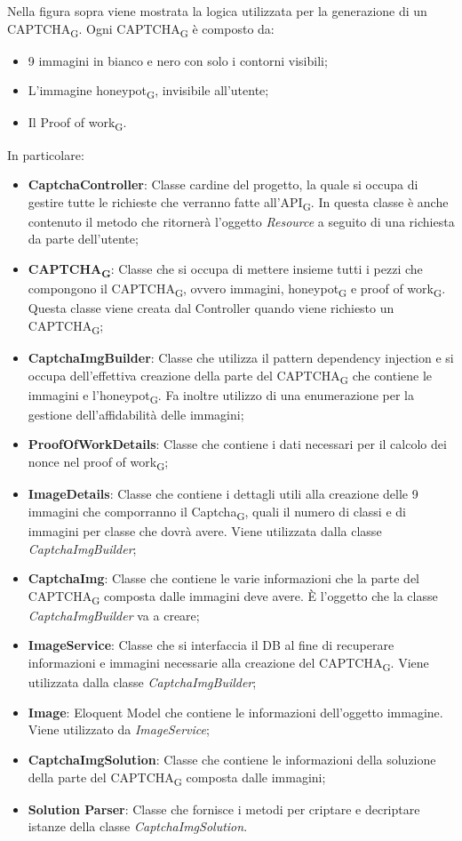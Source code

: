 Nella figura sopra viene mostrata la logica utilizzata per la generazione di un  CAPTCHA\textsubscript{G}.
Ogni CAPTCHA\textsubscript{G} è composto da:
 \begin{itemize}
     \item 9 immagini in bianco e nero con solo i contorni visibili;
     \item L'immagine honeypot\textsubscript{G}, invisibile all'utente;
     \item Il Proof of work\textsubscript{G}.
 \end{itemize}


In particolare:
\begin{itemize}
    \item \textbf{CaptchaController}: Classe cardine del progetto, la quale si occupa di gestire tutte le richieste che verranno fatte all'API\textsubscript{G}. In questa classe è anche contenuto il metodo che ritornerà l'oggetto \textit{Resource} a seguito di una richiesta da parte dell'utente;
    \item \textbf{CAPTCHA\textsubscript{G}}: Classe che si occupa di mettere insieme tutti i pezzi che compongono il CAPTCHA\textsubscript{G}, ovvero immagini, honeypot\textsubscript{G} e proof of work\textsubscript{G}. Questa classe viene creata dal Controller quando viene richiesto un CAPTCHA\textsubscript{G};
    \item \textbf{CaptchaImgBuilder}: Classe che utilizza il pattern dependency injection e si occupa dell'effettiva creazione della parte del CAPTCHA\textsubscript{G} che contiene le immagini e l'honeypot\textsubscript{G}. Fa inoltre utilizzo di una enumerazione per la gestione dell'affidabilità delle immagini;
    \item \textbf{ProofOfWorkDetails}: Classe che contiene i dati necessari per il calcolo dei nonce nel proof of work\textsubscript{G};
    \item \textbf{ImageDetails}: Classe che contiene i dettagli utili alla creazione delle 9 immagini che comporranno il Captcha\textsubscript{G}, quali il numero di classi e di immagini per classe che dovrà avere. Viene utilizzata dalla classe \textit{CaptchaImgBuilder};
    \item \textbf{CaptchaImg}: Classe che contiene le varie informazioni che la parte del CAPTCHA\textsubscript{G} composta dalle immagini deve avere. È l'oggetto che la classe \textit{CaptchaImgBuilder} va a creare;
    \item \textbf{ImageService}: Classe che si interfaccia il DB al fine di recuperare informazioni e immagini necessarie alla creazione del CAPTCHA\textsubscript{G}. Viene utilizzata dalla classe \textit{CaptchaImgBuilder};
    \item \textbf{Image}: Eloquent Model che contiene le informazioni dell'oggetto immagine. Viene utilizzato da \textit{ImageService};
    \item \textbf{CaptchaImgSolution}: Classe che contiene le informazioni della soluzione della parte del CAPTCHA\textsubscript{G} composta dalle immagini;
    \item \textbf{Solution Parser}: Classe che fornisce i metodi per criptare e decriptare istanze della classe \textit{CaptchaImgSolution}.
\end{itemize}


